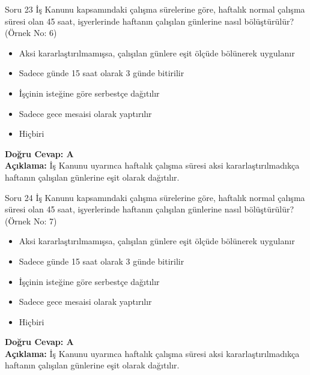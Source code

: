 \documentclass[12pt,a4paper]{article}
\begin{document}
\begin{testcard}{Soru 23}
    İş Kanunu kapsamındaki çalışma sürelerine göre, haftalık normal çalışma süresi olan 45 saat, işyerlerinde haftanın çalışılan günlerine nasıl bölüştürülür? (Örnek No: 6)
    \begin{itemize}
        \item[A)] Aksi kararlaştırılmamışsa, çalışılan günlere eşit ölçüde bölünerek uygulanır
        \item[B)] Sadece günde 15 saat olarak 3 günde bitirilir
        \item[C)] İşçinin isteğine göre serbestçe dağıtılır
        \item[D)] Sadece gece mesaisi olarak yaptırılır
        \item[E)] Hiçbiri
    \end{itemize}
    \tcblower
    \textbf{Doğru Cevap: A} \\
    \textbf{Açıklama:} İş Kanunu uyarınca haftalık çalışma süresi aksi kararlaştırılmadıkça haftanın çalışılan günlerine eşit olarak dağıtılır.
\end{testcard}

\begin{testcard}{Soru 24}
    İş Kanunu kapsamındaki çalışma sürelerine göre, haftalık normal çalışma süresi olan 45 saat, işyerlerinde haftanın çalışılan günlerine nasıl bölüştürülür? (Örnek No: 7)
    \begin{itemize}
        \item[A)] Aksi kararlaştırılmamışsa, çalışılan günlere eşit ölçüde bölünerek uygulanır
        \item[B)] Sadece günde 15 saat olarak 3 günde bitirilir
        \item[C)] İşçinin isteğine göre serbestçe dağıtılır
        \item[D)] Sadece gece mesaisi olarak yaptırılır
        \item[E)] Hiçbiri
    \end{itemize}
    \tcblower
    \textbf{Doğru Cevap: A} \\
    \textbf{Açıklama:} İş Kanunu uyarınca haftalık çalışma süresi aksi kararlaştırılmadıkça haftanın çalışılan günlerine eşit olarak dağıtılır.
\end{testcard}
\end{document}

